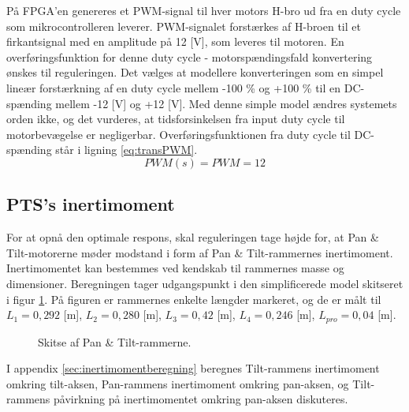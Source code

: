 På FPGA'en genereres et PWM-signal til hver motors H-bro ud fra en
duty cycle som mikrocontrolleren leverer.
PWM-signalet forstærkes af H-broen til et firkantsignal med en amplitude på 12 [V],
som leveres til motoren.
En overføringsfunktion for denne duty cycle - motorspændingsfald konvertering ønskes
til reguleringen.
Det vælges at modellere konverteringen som en simpel lineær forstærkning af en duty cycle mellem -100 \% og +100 \%
til en DC-spænding mellem -12 [V] og +12 [V]. Med denne simple model ændres systemets orden ikke,
og det vurderes, at tidsforsinkelsen fra input duty cycle til motorbevægelse er negligerbar.
Overføringsfunktionen fra duty cycle til DC-spænding står i ligning \ref{eq:transPWM}.
\begin{equation}
	PWM\left(s\right)=PWM=12
	\label{eq:transPWM}
\end{equation}
\subsection{PTS's inertimoment}
\label{sec:inertimoment}
For at opnå den optimale respons, skal reguleringen tage højde for, at Pan \& Tilt-motorerne møder modstand i form af
Pan \& Tilt-rammernes inertimoment. Inertimomentet kan bestemmes ved kendskab til rammernes
masse og dimensioner. Beregningen tager udgangspunkt i den simplificerede model skitseret i figur \ref{fig:inerti_PTS}.
På figuren er rammernes enkelte længder markeret, og de er målt til \({L_{1}} =0,292\) [m],
\({L_{2}} =0,280\) [m], \({L_{3}}= 0,42\) [m], \({L_{4}} =0,246\) [m], \({L_{pro}}=0,04\) [m].
\begin{figure}[!th]
\centering
\begin{tikzpicture}[scale=0.8]

\end{tikzpicture}
\caption[Skitse af Pan \& Tilt-rammerne]{Skitse af Pan \& Tilt-rammerne.}
\label{fig:inerti_PTS}
\end{figure}

I appendix \ref{sec:inertimomentberegning} beregnes Tilt-rammens inertimoment omkring tilt-aksen,
Pan-rammens inertimoment omkring pan-aksen,
og Tilt-rammens påvirkning på inertimomentet omkring pan-aksen diskuteres.

